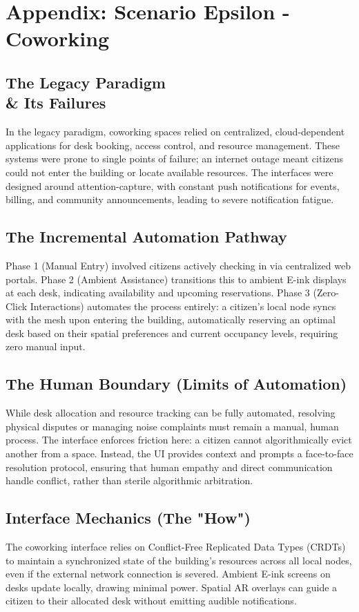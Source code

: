 \chapter{Appendix: Scenario Epsilon - Coworking}

\section{The Legacy Paradigm \\\& Its Failures}
In the legacy paradigm, coworking spaces relied on centralized, cloud-dependent applications for desk booking, access control, and resource management. These systems were prone to single points of failure; an internet outage meant citizens could not enter the building or locate available resources. The interfaces were designed around attention-capture, with constant push notifications for events, billing, and community announcements, leading to severe notification fatigue. 

\section{The Incremental Automation Pathway}
Phase 1 (Manual Entry) involved citizens actively checking in via centralized web portals. Phase 2 (Ambient Assistance) transitions this to ambient E-ink displays at each desk, indicating availability and upcoming reservations. Phase 3 (Zero-Click Interactions) automates the process entirely: a citizen's local node syncs with the mesh upon entering the building, automatically reserving an optimal desk based on their spatial preferences and current occupancy levels, requiring zero manual input.

\section{The Human Boundary (Limits of Automation)}
While desk allocation and resource tracking can be fully automated, resolving physical disputes or managing noise complaints must remain a manual, human process. The interface enforces friction here: a citizen cannot algorithmically evict another from a space. Instead, the UI provides context and prompts a face-to-face resolution protocol, ensuring that human empathy and direct communication handle conflict, rather than sterile algorithmic arbitration.

\section{Interface Mechanics (The "How")}
The coworking interface relies on Conflict-Free Replicated Data Types (CRDTs) to maintain a synchronized state of the building's resources across all local nodes, even if the external network connection is severed. Ambient E-ink screens on desks update locally, drawing minimal power. Spatial AR overlays can guide a citizen to their allocated desk without emitting audible notifications.

